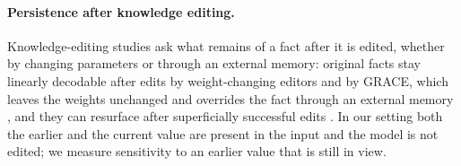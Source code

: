 \paragraph{Persistence after knowledge editing.} Knowledge-editing studies ask what remains of a fact after it is edited, whether by changing parameters or through an external memory: original facts stay linearly decodable after edits by weight-changing editors and by GRACE, which leaves the weights unchanged and overrides the fact through an external memory \citep{srivastava2026suppressed}, and they can resurface after superficially successful edits \citep{xie2025deceptiveness}. In our setting both the earlier and the current value are present in the input and the model is not edited; we measure sensitivity to an earlier value that is still in view.
